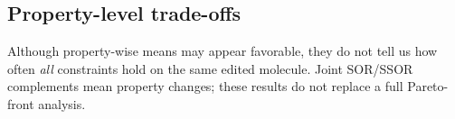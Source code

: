 \subsection{Property-level trade-offs}
\begin{table}[t]
\centering\small
\caption{Mean property scores and joint constraint success rates on the BPQ task.}
\label{tab:bpq_tradeoffs}
\end{table}
Although property-wise means may appear favorable, they do not tell us how often \emph{all} constraints hold on the same edited molecule. Joint SOR/SSOR complements mean property changes; these results do not replace a full Pareto-front analysis.

